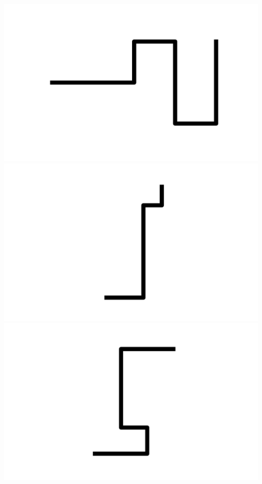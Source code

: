 \documentclass[]{report}
\begin{document}
\includegraphics[scale=.1]{pictures/21/state_cluster_shapes_133.pdf} 
\includegraphics[scale=.1]{pictures/21/state_cluster_shapes_134.pdf} 
\includegraphics[scale=.1]{pictures/21/state_cluster_shapes_135.pdf} 
\end{document}
